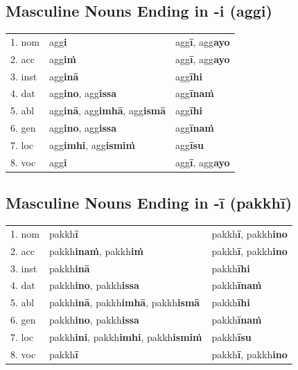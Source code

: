 \documentclass[11pt,oneside]{memoir}
\begin{document}
\subsection{Masculine Nouns Ending in -i (aggi)}
\label{sec:org010aee1}

\begin{center}
\begin{tabular}{lll}
1. nom & agg\textbf{i} & agg\textbf{ī}, agg\textbf{ayo}\\[0pt]
2. acc & agg\textbf{iṁ} & agg\textbf{ī}, agg\textbf{ayo}\\[0pt]
3. inst & agg\textbf{inā} & agg\textbf{īhi}\\[0pt]
4. dat & agg\textbf{ino}, agg\textbf{issa} & agg\textbf{īnaṁ}\\[0pt]
5. abl & agg\textbf{inā}, agg\textbf{imhā}, agg\textbf{ismā} & agg\textbf{īhi}\\[0pt]
6. gen & agg\textbf{ino}, agg\textbf{issa} & agg\textbf{īnaṁ}\\[0pt]
7. loc & agg\textbf{imhi}, agg\textbf{ismiṁ} & agg\textbf{īsu}\\[0pt]
8. voc & agg\textbf{i} & agg\textbf{ī}, agg\textbf{ayo}\\[0pt]
\end{tabular}
\end{center}

\subsection{Masculine Nouns Ending in -ī (pakkhī)}
\label{sec:orgaf0d138}

\begin{center}
\begin{tabular}{lll}
1. nom & pakkh\textbf{ī} & pakkh\textbf{ī}, pakkh\textbf{ino}\\[0pt]
2. acc & pakkh\textbf{inaṁ}, pakkh\textbf{iṁ} & pakkh\textbf{ī}, pakkh\textbf{ino}\\[0pt]
3. inst & pakkh\textbf{inā} & pakkh\textbf{īhi}\\[0pt]
4. dat & pakkh\textbf{ino}, pakkh\textbf{issa} & pakkh\textbf{īnaṁ}\\[0pt]
5. abl & pakkh\textbf{inā}, pakkh\textbf{imhā}, pakkh\textbf{ismā} & pakkh\textbf{īhi}\\[0pt]
6. gen & pakkh\textbf{ino}, pakkh\textbf{issa} & pakkh\textbf{īnaṁ}\\[0pt]
7. loc & pakkh\textbf{ini}, pakkh\textbf{imhi}, pakkh\textbf{ismiṁ} & pakkh\textbf{īsu}\\[0pt]
8. voc & pakkh\textbf{ī} & pakkh\textbf{ī}, pakkh\textbf{ino}\\[0pt]
\end{tabular}
\end{center}
\end{document}
